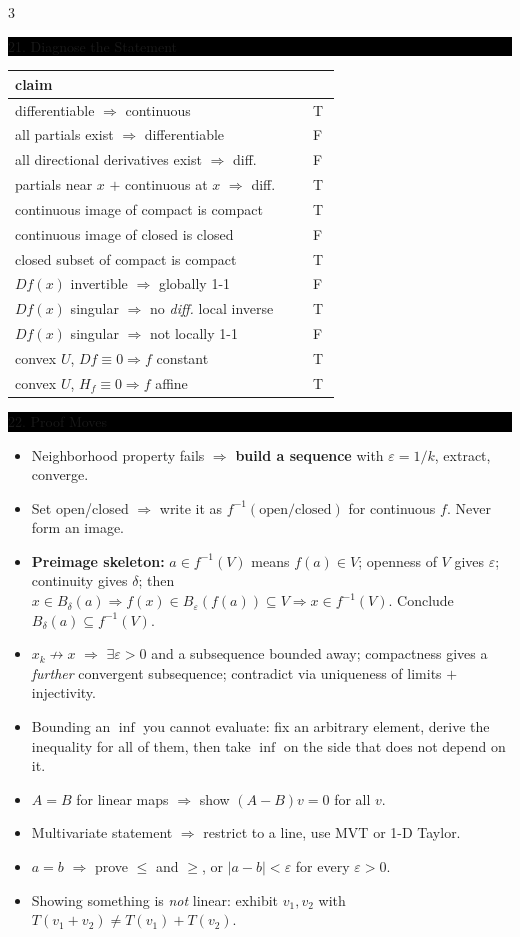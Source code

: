 \documentclass[8pt,letterpaper]{article}
\makeatletter
\newcommand{\sect}[1]{%
  \vspace{2.2pt}%
  \noindent\colorbox{black}{\parbox{\dimexpr\linewidth-2\fboxsep}{%
    \color{white}\bfseries\scshape\fontsize{6.4}{7.4}\selectfont
    \hyphenpenalty=10000\exhyphenpenalty=10000\raggedright #1}}%
  \vspace{1.4pt}\par\nopagebreak\@afterheading}
\newenvironment{tl}
  {\begin{itemize}[leftmargin=6pt,itemsep=0.3pt,topsep=1pt,parsep=0pt,
                   partopsep=0pt,label=\textcolor{gray}{\tiny$\bullet$}]}
  {\end{itemize}}
\newcommand{\Dd}{D}
\makeatother
\begin{document}
\begin{multicols}{3}
\sect{21. Diagnose the Statement}
\begin{center}\fontsize{5.9}{6.9}\selectfont
\begin{tabular}{@{}p{0.84\linewidth}@{}p{0.08\linewidth}@{}}
\hline
claim & \\ \hline
differentiable $\Rightarrow$ continuous & T\\
all partials exist $\Rightarrow$ differentiable & F\\
all directional derivatives exist $\Rightarrow$ diff. & F\\
partials near $x$ $+$ continuous at $x$ $\Rightarrow$ diff. & T\\
continuous image of compact is compact & T\\
continuous image of closed is closed & F\\
closed subset of compact is compact & T\\
$\Dd f(x)$ invertible $\Rightarrow$ globally 1-1 & F\\
$\Dd f(x)$ singular $\Rightarrow$ no \emph{diff.} local inverse & T\\
$\Dd f(x)$ singular $\Rightarrow$ not locally 1-1 & F\\
convex $U$, $\Dd f\equiv0\Rightarrow f$ constant & T\\
convex $U$, $H_f\equiv0\Rightarrow f$ affine & T\\ \hline
\end{tabular}
\end{center}

\sect{22. Proof Moves}
\begin{tl}
\item Neighborhood property fails $\Rightarrow$ \textbf{build a sequence} with $\varepsilon=1/k$, extract, converge.
\item Set open/closed $\Rightarrow$ write it as $f^{-1}(\text{open/closed})$ for continuous $f$. Never form an image.
\item \textbf{Preimage skeleton:} $a\in f^{-1}(V)$ means $f(a)\in V$; openness of $V$ gives $\varepsilon$; continuity gives $\delta$; then $x\in B_\delta(a)\Rightarrow f(x)\in B_\varepsilon(f(a))\subseteq V\Rightarrow x\in f^{-1}(V)$. Conclude $B_\delta(a)\subseteq f^{-1}(V)$.
\item $x_k\not\to x$ $\Rightarrow$ $\exists\varepsilon>0$ and a subsequence bounded away; compactness gives a \emph{further} convergent subsequence; contradict via uniqueness of limits $+$ injectivity.
\item Bounding an $\inf$ you cannot evaluate: fix an arbitrary element, derive the inequality for all of them, then take $\inf$ on the side that does not depend on it.
\item $A=B$ for linear maps $\Rightarrow$ show $(A-B)v=0$ for all $v$.
\item Multivariate statement $\Rightarrow$ restrict to a line, use MVT or 1-D Taylor.
\item $a=b$ $\Rightarrow$ prove $\le$ and $\ge$, or $|a-b|<\varepsilon$ for every $\varepsilon>0$.
\item Showing something is \emph{not} linear: exhibit $v_1,v_2$ with $T(v_1+v_2)\ne T(v_1)+T(v_2)$.
\end{tl}

\end{multicols}
\end{document}
